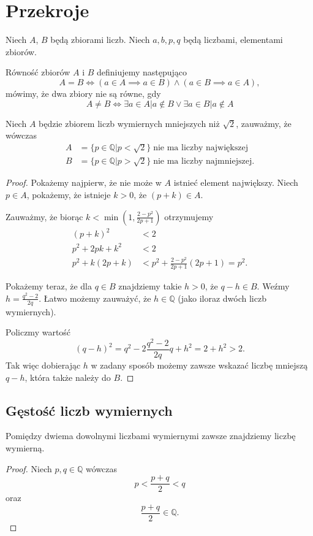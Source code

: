\section{Przekroje}
Niech $A$, $B$ będą zbiorami liczb. Niech $a,b,p,q$ będą liczbami, elementami zbiorów.

Równość zbiorów $A$ i $B$ definiujemy następująco
$$ A = B \iff (a\in A \implies a\in B) \wedge (a\in B \implies a\in A), $$
mówimy, że dwa zbiory nie są równe, gdy
$$ A \neq B \iff \exists a \in A | a\notin B \vee \exists a \in B | a \notin A$$

Niech $A$ będzie zbiorem liczb wymiernych mniejszych niż $\sqrt{2}$, zauważmy, że wówczas
\begin{align*}
A & = \{ p \in \mathbb{Q} | p < \sqrt{2} \} \; \mbox{nie ma liczby największej} \\
B & = \{ p \in \mathbb{Q} | p > \sqrt{2} \} \; \mbox{nie ma liczby najmniejszej}.
\end{align*}

\begin{proof}
Pokażemy najpierw, że nie może w $A$ istnieć element największy. 
Niech $p\in A$, pokażemy, że istnieje $k>0$, że $(p+k)\in A$.

Zauważmy, że biorąc $k <\min \left( 1,\frac{2-p^2}{2p+1} \right)$ otrzymujemy
\begin{align*}
(p+k)^2 &< 2 \\
p^2 + 2pk + k^2 & < 2 \\
p^2 + k(2p+k) & < p^2 + \frac{2-p^2}{2p+1} \left( 2p + 1\right)  = p^2 . 
\end{align*}

Pokażemy teraz, że dla $q\in B$ znajdziemy takie $h >0 $, że $q-h \in B$.
Weźmy $h = \frac{q^2 - 2}{2q}.$  Łatwo możemy zauważyć, że $h \in \mathbb{Q}$ (jako iloraz dwóch liczb wymiernych).

Policzmy wartość 
$$ (q-h)^2 = q^2 - 2 \frac{q^2-2}{2q}q + h^2 = 2+h^2 > 2.$$
Tak więc dobierając $h$ w zadany sposób możemy zawsze wskazać liczbę mniejszą $q-h$, która także należy do $B$.
\end{proof}

\subsection{Gęstość liczb wymiernych}
Pomiędzy dwiema dowolnymi liczbami wymiernymi zawsze znajdziemy liczbę wymierną.

\begin{proof}
Niech $p,q\in \mathbb{Q}$ wówczas 
$$ p < \frac{p+q}{2} < q $$
oraz $$ \frac{p+q}{2} \in \mathbb{Q}.$$
\end{proof}

